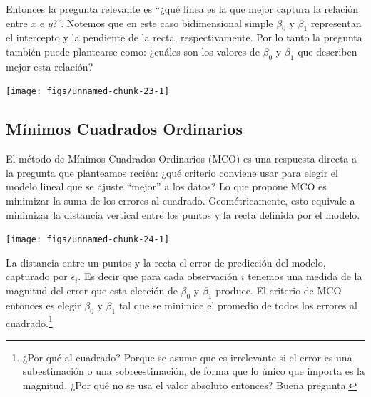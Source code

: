 \documentclass{article}\usepackage[]{graphicx}\usepackage[]{color}
\newenvironment{knitrout}{}{} %
\begin{document}
Entonces la pregunta relevante es ``¿qué línea es la que mejor captura la relación entre $x$ e $y$?''.
Notemos que en este caso bidimensional simple $\beta_0$ y $\beta_1$ representan el intercepto y la pendiente de la recta, respectivamente.
Por lo tanto la pregunta también puede plantearse como: ¿cuáles son los valores de $\beta_0$ y $\beta_1$ que describen mejor esta relación?


\begin{knitrout}
\color{fgcolor}

{\centering \texttt{[image: figs/unnamed-chunk-23-1]} 

}



\end{knitrout}

\subsection{Mínimos Cuadrados Ordinarios}

El método de Mínimos Cuadrados Ordinarios (MCO) es una respuesta directa a la pregunta que planteamos recién: ¿qué criterio conviene usar para elegir el modelo lineal que se ajuste ``mejor'' a los datos?
Lo que propone MCO es minimizar la suma de los errores al cuadrado.
Geométricamente, esto equivale a minimizar la distancia vertical entre los puntos y la recta definida por el modelo.

\begin{knitrout}
\color{fgcolor}

{\centering \texttt{[image: figs/unnamed-chunk-24-1]} 

}



\end{knitrout}

La distancia entre un puntos y la recta el error de predicción del modelo, capturado por $\epsilon_i$. Es decir que para cada observación $i$ tenemos una medida de la magnitud del error que esta elección de $\beta_0$ y $\beta_1$ produce. El criterio de MCO entonces es elegir $\beta_0$ y $\beta_1$ tal que se minimice el promedio de todos los errores al cuadrado.\footnote{¿Por qué al cuadrado? Porque se asume que es irrelevante si el error es una subestimación o una sobreestimación, de forma que lo único que importa es la magnitud. ¿Por qué no se usa el valor absoluto entonces? Buena pregunta.}
\end{document}
